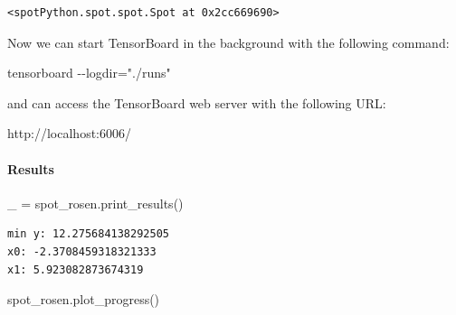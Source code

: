 \documentclass[
  letterpaper,
  DIV=11,
  numbers=noendperiod]{scrreprt}
\let\oldparagraph\paragraph
\renewcommand{\paragraph}[1]{\oldparagraph{#1}\mbox{}}
\newenvironment{Shaded}{\begin{snugshade}}{\end{snugshade}}
\newcommand{\NormalTok}[1]{\textcolor[rgb]{0.00,0.23,0.31}{#1}}
\newcommand{\OperatorTok}[1]{\textcolor[rgb]{0.37,0.37,0.37}{#1}}
\begin{document}
\begin{verbatim}
<spotPython.spot.spot.Spot at 0x2cc669690>
\end{verbatim}

\begin{tcolorbox}[enhanced jigsaw, rightrule=.15mm, coltitle=black, title=\textcolor{quarto-callout-note-color}{\faInfo}\hspace{0.5em}{Note}, opacitybacktitle=0.6, bottomrule=.15mm, opacityback=0, left=2mm, colback=white, leftrule=.75mm, colframe=quarto-callout-note-color-frame, colbacktitle=quarto-callout-note-color!10!white, toprule=.15mm, toptitle=1mm, bottomtitle=1mm, titlerule=0mm, breakable, arc=.35mm]

Now we can start TensorBoard in the background with the following
command:

\begin{Shaded}
\begin{Highlighting}[]
\NormalTok{tensorboard {-}{-}logdir="./runs"}
\end{Highlighting}
\end{Shaded}

and can access the TensorBoard web server with the following URL:

\begin{Shaded}
\begin{Highlighting}[]
\NormalTok{http://localhost:6006/}
\end{Highlighting}
\end{Shaded}

\end{tcolorbox}

\paragraph{Results}\label{results-3}

\begin{Shaded}
\begin{Highlighting}[]
\NormalTok{\_ }\OperatorTok{=}\NormalTok{ spot\_rosen.print\_results()}
\end{Highlighting}
\end{Shaded}

\begin{verbatim}
min y: 12.275684138292505
x0: -2.3708459318321333
x1: 5.923082873674319
\end{verbatim}

\begin{Shaded}
\begin{Highlighting}[]
\NormalTok{spot\_rosen.plot\_progress()}
\end{Highlighting}
\end{Shaded}
\end{document}
